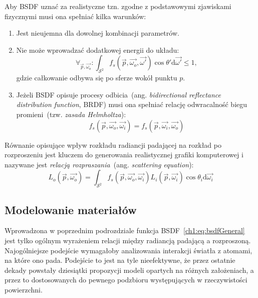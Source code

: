 \begin{itemize}
Aby BSDF uznać za realistyczne tzn. zgodne z podstawowymi zjawiskami fizycznymi musi ona spełniać kilka warunków:
\begin{enumerate}
\item Jest nieujemna dla dowolnej kombinacji parametrów.
\item Nie może wprowadzać dodatkowej energii do układu:
\begin{equation}
\forall_{\vec{p}, \vec{\omega_o}}: \int_{\mathcal{S}^2}f_s(\vec{p}, \vec{\omega_o}, \vec{\omega'})\cos\theta'\mathrm{d}\vec{\omega'} \leq 1,
\end{equation}
gdzie całkowanie odbywa się po sferze wokół punktu $p$.
\item Jeżeli BSDF opisuje procesy odbicia~(ang. \textit{bidirectional reflectance distribution function}, BRDF) musi ona spełniać relację odwracalność biegu promieni~(tzw. \textit{zasada Helmholtza}):
\begin{equation}
f_s(\vec{p}, \vec{\omega_o}, \vec{\omega_i}) = f_s(\vec{p}, \vec{\omega_i}, \vec{\omega_o})
\end{equation}
\end{enumerate}
Równanie opisujące wpływ rozkładu radiancji padającej na rozkład po rozproszeniu jest kluczem do generowania realistycznej grafiki komputerowej i nazywane jest \textit{relacją rozpraszania}~(ang. \textit{scattering equation}):
\begin{equation}
L_o(\vec{p}, \vec{\omega_o}) = \int_{\mathcal{S}^2}f_s(\vec{p}, \vec{\omega_o}, \vec{\omega_i})L_i(\vec{p}, \vec{\omega_i})\cos\theta_i\mathrm{d}\vec{\omega_i}
\label{ch1:eq:ScatteringEquation}
\end{equation}
\end{itemize}

\subsection{Modelowanie materiałów}
Wprowadzona w poprzednim podrozdziale funkcja BSDF~\eqref{ch1:eq:bsdfGeneral} jest tylko ogólnym wyrażeniem relacji między radiancją padającą a rozproszoną. Najogólniejsze podejście wymagałoby analizowania interakcji światła z atomami, na które ono pada. Podejście to jest na tyle nieefektywne, że przez ostatnie dekady powstały dziesiątki propozycji modeli opartych na różnych założeniach, a przez to dostosowanych do pewnego podzbioru występujących w rzeczywistości powierzchni. 

